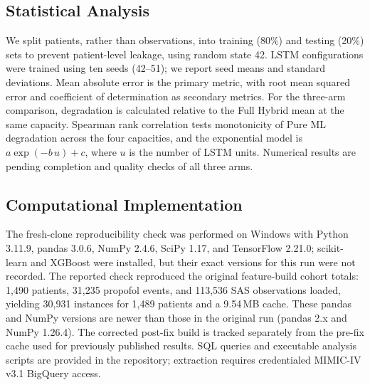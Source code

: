 \documentclass[11pt,a4paper]{article}
\begin{document}
\subsection{Statistical Analysis}

We split patients, rather than observations, into training (80\%) and testing (20\%) sets to prevent patient-level leakage, using random state 42. LSTM configurations were trained using ten seeds (42--51); we report seed means and standard deviations. Mean absolute error is the primary metric, with root mean squared error and coefficient of determination as secondary metrics. For the three-arm comparison, degradation is calculated relative to the Full Hybrid mean at the same capacity. Spearman rank correlation tests monotonicity of Pure ML degradation across the four capacities, and the exponential model is $a\exp(-b\,u)+c$, where $u$ is the number of LSTM units. Numerical results are pending completion and quality checks of all three arms.

\subsection{Computational Implementation}

The fresh-clone reproducibility check was performed on Windows with Python 3.11.9, pandas 3.0.6, NumPy 2.4.6, SciPy 1.17, and TensorFlow 2.21.0; scikit-learn and XGBoost were installed, but their exact versions for this run were not recorded. The reported check reproduced the original feature-build cohort totals: 1,490 patients, 31,235 propofol events, and 113,536 SAS observations loaded, yielding 30,931 instances for 1,489 patients and a 9.54\,MB cache. These pandas and NumPy versions are newer than those in the original run (pandas 2.x and NumPy 1.26.4). The corrected post-fix build is tracked separately from the pre-fix cache used for previously published results. SQL queries and executable analysis scripts are provided in the repository; extraction requires credentialed MIMIC-IV v3.1 BigQuery access.

%
\end{document}
